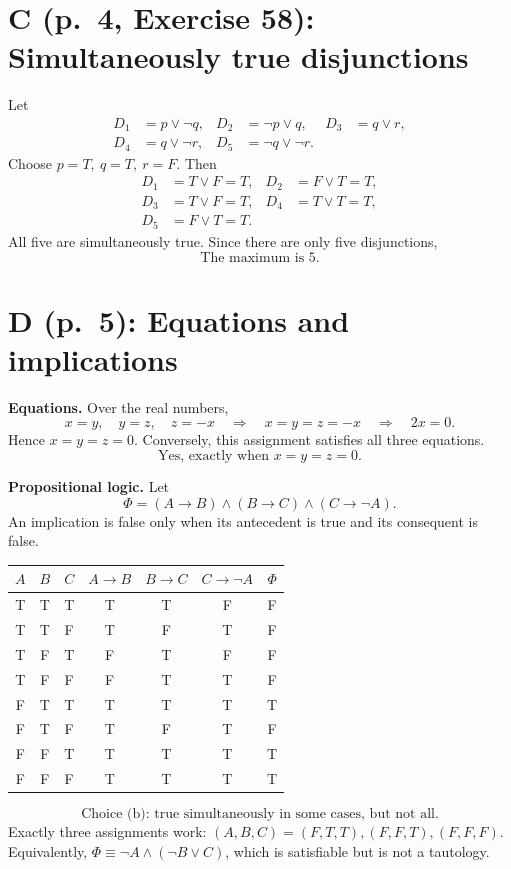 \documentclass[11pt,a4paper]{article}
\begin{document}
\newpage
\section*{C (p.\ 4, Exercise 58): Simultaneously true disjunctions}
Let
\[
\begin{aligned}
D_1&=p\lor\neg q,&D_2&=\neg p\lor q,&D_3&=q\lor r,\\
D_4&=q\lor\neg r,&D_5&=\neg q\lor\neg r.
\end{aligned}
\]
Choose $p=T,\ q=T,\ r=F$. Then
\[
\begin{aligned}
D_1&=T\lor F=T, &D_2&=F\lor T=T,\\
D_3&=T\lor F=T, &D_4&=T\lor T=T,\\
D_5&=F\lor T=T.
\end{aligned}
\]
All five are simultaneously true. Since there are only five disjunctions,
\[
\boxed{\text{The maximum is }5.}
\]

\section*{D (p.\ 5): Equations and implications}
\textbf{Equations.} Over the real numbers,
\[
x=y,\quad y=z,\quad z=-x
\quad\Longrightarrow\quad x=y=z=-x
\quad\Longrightarrow\quad 2x=0.
\]
Hence $x=y=z=0$. Conversely, this assignment satisfies all three equations.
\[
\boxed{\text{Yes, exactly when }x=y=z=0.}
\]

\textbf{Propositional logic.} Let
\[
\Phi=(A\to B)\land(B\to C)\land(C\to\neg A).
\]
An implication is false only when its antecedent is true and its consequent
is false.
\begin{center}
\renewcommand{\arraystretch}{1.16}
\begin{tabular}{ccc|ccc|c}
\toprule
$A$&$B$&$C$&$A\to B$&$B\to C$&$C\to\neg A$&$\Phi$\\
\midrule
T&T&T&T&T&F&F\\
T&T&F&T&F&T&F\\
T&F&T&F&T&F&F\\
T&F&F&F&T&T&F\\
F&T&T&T&T&T&T\\
F&T&F&T&F&T&F\\
F&F&T&T&T&T&T\\
F&F&F&T&T&T&T\\
\bottomrule
\end{tabular}
\end{center}
\[
\boxed{\text{Choice (b): true simultaneously in some cases, but not all.}}
\]
Exactly three assignments work: $(A,B,C)=(F,T,T),(F,F,T),(F,F,F)$.
Equivalently, $\Phi\equiv\neg A\land(\neg B\lor C)$, which is satisfiable
but is not a tautology.
\end{document}
